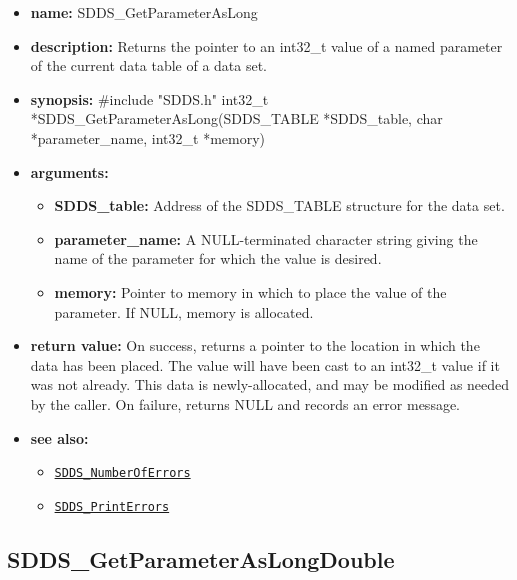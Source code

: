 \documentclass[11pt]{article}
\newcommand{\progref}[1]{\hyperref[SDDS_#1]{\tt SDDS\_#1}}
\begin{document}
\begin{itemize}
\item {\bf name:}\newline
SDDS\_GetParameterAsLong
\item {\bf description:}\newline
Returns the pointer to an int32\_t value of a named parameter of the current data table of a data set.
\item {\bf synopsis:} \#include "SDDS.h"\newline
int32\_t *SDDS\_GetParameterAsLong(SDDS\_TABLE *SDDS\_table, char *parameter\_name, int32\_t *memory)
\item {\bf arguments:}
\begin{itemize}
\item {\bf SDDS\_table:} Address of the SDDS\_TABLE structure for the data set.
\item {\bf parameter\_name:} A NULL-terminated character string giving the name of the parameter for which the value is desired.
\item {\bf memory:} Pointer to memory in which to place the value of the parameter. If NULL, memory is allocated.
\end{itemize}
\item {\bf return value:}\newline
On success, returns a pointer to the location in which the data has been placed. The value will have been cast to an int32\_t value if it was not already. This data is newly-allocated, and may be modified as needed by the caller. On failure, returns NULL and records an error message.
\item {\bf see also:}
\begin{itemize}
\item \progref{NumberOfErrors}
\item \progref{PrintErrors}
\end{itemize}
\end{itemize}

\subsection{SDDS\_GetParameterAsLongDouble}
\label{SDDS_GetParameterAsLongDouble}
\end{document}
